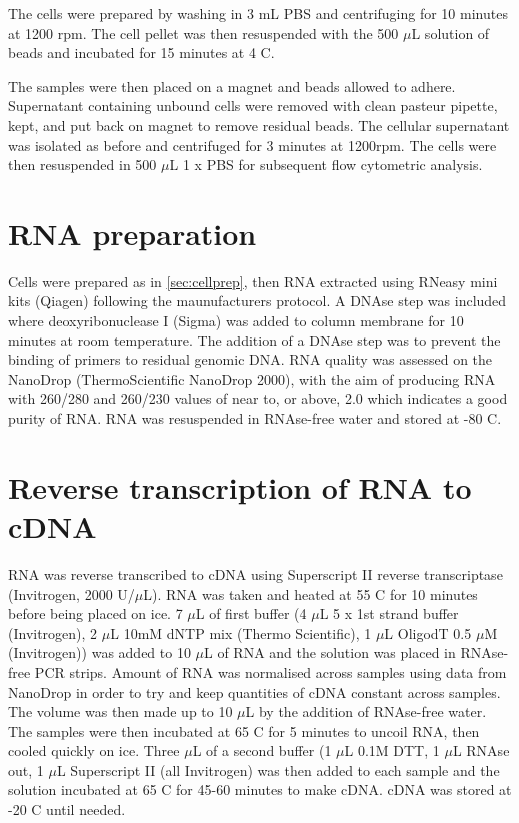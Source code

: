 The cells were prepared by washing in 3 mL PBS and centrifuging for 10 minutes at 1200 rpm.
The cell pellet was then resuspended with the 500 $\mu$L solution of beads and incubated for 15 minutes at 4 \textdegree C.

The samples were then placed on a magnet and beads allowed to adhere.
Supernatant containing unbound cells were removed with clean pasteur pipette, kept, and put back on magnet to remove residual beads.
The cellular supernatant was isolated as before and centrifuged for 3 minutes at 1200rpm.
The cells were then resuspended in 500 $\mu$L 1 x PBS for subsequent flow cytometric analysis.

\section{RNA preparation}

Cells were prepared as in \cref{sec:cellprep}, then RNA extracted using RNeasy mini kits (Qiagen) following the maunufacturers protocol.
A DNAse step was included where deoxyribonuclease I (Sigma) was added to column membrane for 10 minutes at room temperature.
The addition of a DNAse step was to prevent the binding of primers to residual genomic DNA.
RNA quality was assessed on the NanoDrop (ThermoScientific NanoDrop 2000), with the aim of producing RNA with 260/280 and 260/230 values of near to, or above, 2.0 which indicates a good purity of RNA.
RNA was resuspended in RNAse-free water and stored at -80 \textdegree C.


\section{Reverse transcription of RNA to cDNA}

RNA was reverse transcribed to cDNA using Superscript II reverse transcriptase (Invitrogen, 2000 U/$\mu$L).
 RNA was taken and heated at 55 \textdegree C for 10 minutes before being placed on ice.
7 $\mu$L of first buffer (4 $\mu$L 5 x 1st strand buffer (Invitrogen), 2 $\mu$L 10mM dNTP mix (Thermo Scientific), 1 $\mu$L OligodT 0.5 $\mu$M (Invitrogen)) was added to 10 $\mu$L of RNA and the solution was placed in RNAse-free PCR strips.
Amount of RNA was normalised across samples using data from NanoDrop in order to try and keep quantities of cDNA constant across samples.
The volume was then made up to 10 $\mu$L by the addition of RNAse-free water.
The samples were then incubated at 65 \textdegree C for 5 minutes to uncoil RNA, then cooled quickly on ice.
Three $\mu$L of a second buffer (1 $\mu$L 0.1M DTT, 1 $\mu$L RNAse out, 1 $\mu$L Superscript II (all Invitrogen) was then added to each sample and the solution incubated at 65 \textdegree C for 45-60 minutes to make cDNA.
cDNA was stored at -20 \textdegree C until needed.

